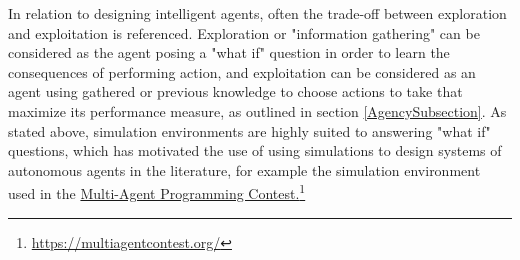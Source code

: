 
 In relation to designing intelligent agents, often the trade-off between exploration and exploitation is referenced. Exploration or "information gathering" \cite{AIAMA} can be considered as the agent posing a "what if" question in order to learn the consequences of performing action, and exploitation can be considered as an agent using gathered or previous knowledge to choose actions to take that maximize its performance measure, as outlined in section \ref{AgencySubsection}. As stated above, simulation environments are highly suited to answering "what if" questions, which has motivated the use of using simulations to design systems of autonomous agents in the literature, for example the simulation environment used in the 
\href{https://multiagentcontest.org/}{Multi-Agent Programming Contest.}\footnote{\href {https://multiagentcontest.org/}{https://multiagentcontest.org/}}



